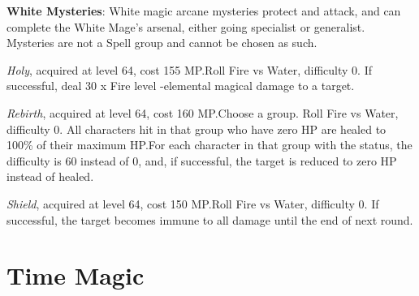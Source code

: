 \begin{multicols}{2}
    \textbf{White Mysteries}: White magic arcane mysteries protect and attack, and can complete the White Mage's arsenal, either going specialist or generalist. Mysteries are not a Spell group and cannot be chosen as such.

    \textit{Holy}, acquired at level 64, cost 155 MP.\@{}Roll Fire vs Water, difficulty 0. If successful, deal 30 x Fire level -elemental magical damage to a target.  

    \textit{Rebirth}, acquired at level 64, cost 160 MP.\@{}Choose a group. Roll Fire vs Water, difficulty 0. All characters hit in that group who have zero HP are healed to 100\% of their maximum HP.\@{}For each character in that group with the  status, the difficulty is 60 instead of 0, and, if successful, the target is reduced to zero HP instead of healed.

    \textit{Shield}, acquired at level 64, cost 150 MP.\@{}Roll Fire vs Water, difficulty 0. If successful, the target becomes immune to all damage until the end of next round.


\end{multicols}

\section{Time Magic}\label{sec:magic-time}

